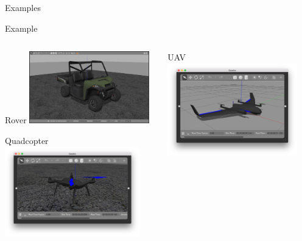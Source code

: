 \documentclass[9pt]{beamer}
\begin{document}
\begin{section}{Examples}
    \begin{frame}{Example}
    \begin{columns}
        \begin{column}{0.5\textwidth}
            \begin{block}{Rover}
                \includegraphics[width=0.8\textwidth,trim={0cm 0cm 0cm 0cm},clip]{rover.png}
            \end{block}
            \begin{block}{Quadcopter}        
                \includegraphics[width=0.9\textwidth,trim={0cm 0cm 0cm 0cm},clip]{solo.png}
            \end{block}
        \end{column}
        \begin{column}{0.5\textwidth}
            \begin{block}{UAV}            
                \includegraphics[width=0.9\textwidth,trim={0cm 0cm 0cm 0cm},clip]{standard_vtol.png}

\end{block}
\end{column}
\end{columns}
\end{frame}
\end{section}
\end{document}
